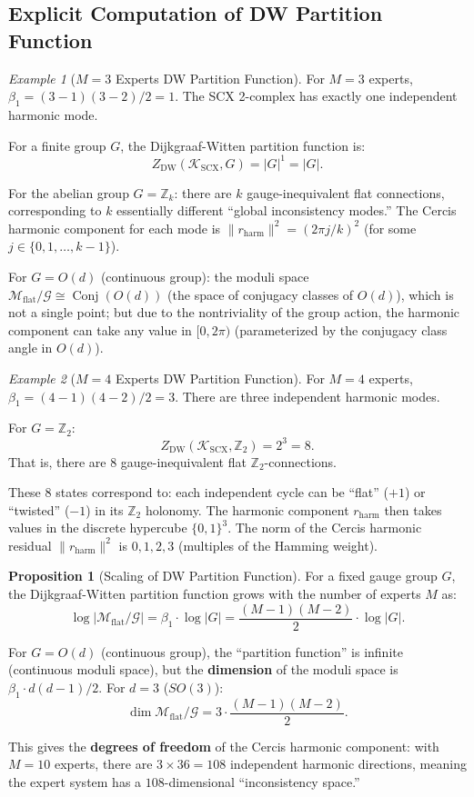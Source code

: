 \documentclass[12pt,a4paper]{article}
\theoremstyle{definition}
\newtheorem{proposition}{Proposition}[section]
\theoremstyle{remark}
\newtheorem{example}{Example}[section]
\theoremstyle{definition}
\newcommand{\Z}{\mathbb{Z}}
\newcommand{\Od}{O(d)}
\newcommand{\SOthree}{SO(3)}
\newcommand{\DW}{\mathrm{DW}}
\newcommand{\ZBetti}{\beta_1}
\newcommand{\Gflatquot}{\mathcal{M}_{\mathrm{flat}}/\mathcal{G}}
\begin{document}
\subsection{Explicit Computation of DW Partition Function}

\begin{example}[$M=3$ Experts DW Partition Function]\label{ex:dw_m3}
For $M=3$ experts, $\ZBetti = (3-1)(3-2)/2 = 1$. The SCX 2-complex has exactly one independent harmonic mode.

For a finite group $G$, the Dijkgraaf-Witten partition function is:
\[
    Z_{\DW}(\mathcal{K}_{\text{SCX}}, G) = |G|^1 = |G|.
\]

For the abelian group $G = \Z_k$: there are $k$ gauge-inequivalent flat connections, corresponding to $k$ essentially different
``global inconsistency modes.'' The Cercis harmonic component for each mode is $\|r_{\text{harm}}\|^2 = (2\pi j/k)^2$ (for some $j \in \{0,1,\dots,k-1\}$).

For $G = \Od$ (continuous group): the moduli space $\Gflatquot \cong \operatorname{Conj}(\Od)$ (the space of conjugacy classes of $\Od$), which is not a single point;
but due to the nontriviality of the group action, the harmonic component can take any value in $[0, 2\pi)$ (parameterized by the conjugacy class angle in $\Od$).
\end{example}

\begin{example}[$M=4$ Experts DW Partition Function]\label{ex:dw_m4}
For $M=4$ experts, $\ZBetti = (4-1)(4-2)/2 = 3$. There are three independent harmonic modes.

For $G = \Z_2$:
\[
    Z_{\DW}(\mathcal{K}_{\text{SCX}}, \Z_2) = 2^3 = 8.
\]
That is, there are $8$ gauge-inequivalent flat $\Z_2$-connections.

These $8$ states correspond to: each independent cycle can be ``flat'' ($+1$) or ``twisted'' ($-1$) in its $\Z_2$ holonomy.
The harmonic component $r_{\text{harm}}$ then takes values in the discrete hypercube $\{0, 1\}^3$.
The norm of the Cercis harmonic residual $\|r_{\text{harm}}\|^2$ is $0, 1, 2, 3$ (multiples of the Hamming weight).
\end{example}

\begin{proposition}[Scaling of DW Partition Function]\label{prop:dw_scaling}
For a fixed gauge group $G$, the Dijkgraaf-Witten partition function grows with the number of experts $M$ as:
\[
    \log |\Gflatquot| = \ZBetti \cdot \log |G| = \frac{(M-1)(M-2)}{2} \cdot \log |G|.
\]

For $G = \Od$ (continuous group), the ``partition function'' is infinite (continuous moduli space), but the \textbf{dimension} of the moduli space is
$\ZBetti \cdot d(d-1)/2$. For $d=3$ ($\SOthree$):
\[
    \dim \Gflatquot = 3 \cdot \frac{(M-1)(M-2)}{2}.
\]

This gives the \textbf{degrees of freedom} of the Cercis harmonic component: with $M=10$ experts, there are $3 \times 36 = 108$ independent harmonic directions,
meaning the expert system has a $108$-dimensional ``inconsistency space.''
\end{proposition}
\end{document}
